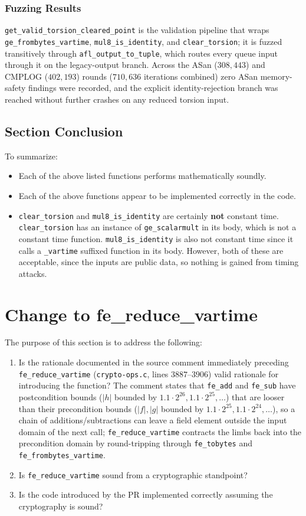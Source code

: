 \documentclass[12pt,titlepage,table]{article}
\begin{document}
\subsubsection{Fuzzing Results}
\verb+get_valid_torsion_cleared_point+ is the validation pipeline that wraps \verb+ge_frombytes_vartime+, \verb+mul8_is_identity+, and \verb+clear_torsion+; it is fuzzed transitively through \verb+afl_output_to_tuple+, which routes every queue input through it on the legacy-output branch.  Across the ASan ($308{,}443$) and CMPLOG ($402{,}193$) rounds ($710{,}636$ iterations combined) zero ASan memory-safety findings were recorded, and the explicit identity-rejection branch was reached without further crashes on any reduced torsion input.

\newpage
\subsection[Section Conclusion]{Section Conclusion \hfill \checkmark}
To summarize:
\begin{itemize}
\item Each of the above listed functions performs mathematically soundly.
\item Each of the above functions appear to be implemented correctly in the code.
\item \verb+clear_torsion+ and \verb+mul8_is_identity+ are certainly \textbf{not} constant time. \verb+clear_torsion+ has an instance of \verb+ge_scalarmult+ in its body, which is not a constant time function. \verb+mul8_is_identity+ is also not constant time since it calls a \verb+_vartime+ suffixed function in its body. However, both of these are acceptable, since the inputs are public data, so nothing is gained from timing attacks.
\end{itemize}

\newpage
\section{Change to fe\_reduce\_vartime}
The purpose of this section is to address the following:
\begin{enumerate}
    \item Is the rationale documented in the source comment immediately preceding \verb+fe_reduce_vartime+ (\verb+crypto-ops.c+, lines $3887$--$3906$) valid rationale for introducing the function? The comment states that \verb+fe_add+ and \verb+fe_sub+ have postcondition bounds ($|h|$ bounded by $1.1 \cdot 2^{26}, 1.1 \cdot 2^{25}, \dots$) that are looser than their precondition bounds ($|f|, |g|$ bounded by $1.1 \cdot 2^{25}, 1.1 \cdot 2^{24}, \dots$), so a chain of additions/subtractions can leave a field element outside the input domain of the next call; \verb+fe_reduce_vartime+ contracts the limbs back into the precondition domain by round-tripping through \verb+fe_tobytes+ and \verb+fe_frombytes_vartime+.
    \item Is \verb+fe_reduce_vartime+ sound from a cryptographic standpoint?
    \item Is the code introduced by the PR implemented correctly assuming the cryptography is sound?
\end{enumerate}
\end{document}
